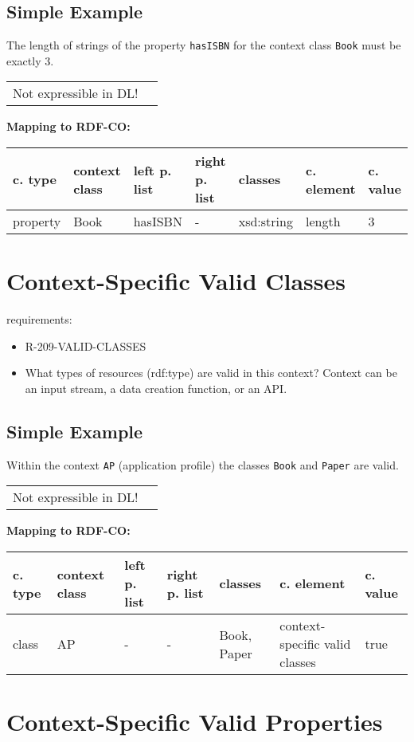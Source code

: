 \documentclass{llncs}
\newcommand{\ms}[1]{\texttt{#1}}
\newenvironment{gcotable}{
  \scriptsize
  \sffamily
  \vspace{0cm}
	\begin{center}
	\textbf{\vspace{0.4cm}Mapping to RDF-CO:} \\
  \begin{tabular}{l|l|l|l|l|l|l}
	\hline
  \textbf{c. type} & \textbf{context class} & \textbf{left p. list} & \textbf{right p. list} & \textbf{classes} & \textbf{c. element} & \textbf{c. value} \\
  \hline

}{
  \hline
  \end{tabular}
	\end{center}
}
\newenvironment{DL}{
  \vspace{0cm}
	\begin{center}
  \begin{tabular}{r l}

}{
  \end{tabular}
	\end{center}
}
\begin{document}
\subsection{Simple Example}

The length of strings of the property \ms{hasISBN} for the context class \ms{Book} must be exactly 3.

\begin{DL}
Not expressible in DL!
\end{DL}

\begin{gcotable}
property & Book & hasISBN & - & xsd:string & length & 3 \\
\end{gcotable}

\section{Context-Specific Valid Classes}

requirements:

\begin{itemize}
	\item R-209-VALID-CLASSES
\end{itemize}

\begin{itemize}
	\item What types of resources (rdf:type) are valid in this context? Context can be an input stream, a data creation function, or an API.
\end{itemize}

\subsection{Simple Example}

Within the context \ms{AP} (application profile) the classes \ms{Book} and \ms{Paper} are valid.

\begin{DL}
Not expressible in DL!
\end{DL}

\begin{gcotable}
class & AP & - & - & Book, Paper & context-specific valid classes & true \\
\end{gcotable}

\section{Context-Specific Valid Properties}
\end{document}
